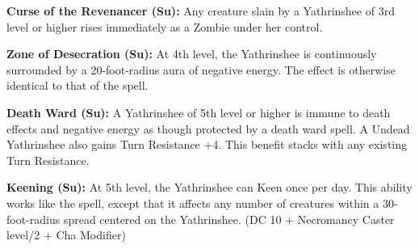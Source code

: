 \textbf{Curse of the Revenancer (Su):} Any creature slain by a Yathrinshee of 3rd level or higher rises immediately as a Zombie under her control.

\textbf{Zone of Desecration (Su):} At 4th level, the Yathrinshee is continuously surrounded by a 20-foot-radius aura of negative energy. The effect is otherwise identical to that of the  spell.

\textbf{Death Ward (Su):} A Yathrinshee of 5th level or higher is immune to death effects and negative energy as though protected by a death ward spell. A Undead Yathrinshee also gains Turn Resistance +4. This benefit stacks with any existing Turn Resistance.

\textbf{Keening (Su):} At 5th level, the Yathrinshee can Keen once per day. This ability works like the  spell, except that it affects any number of creatures within a 30-foot-radius spread centered on the Yathrinshee. (DC 10 + Necromancy Caster level/2 + Cha Modifier)




